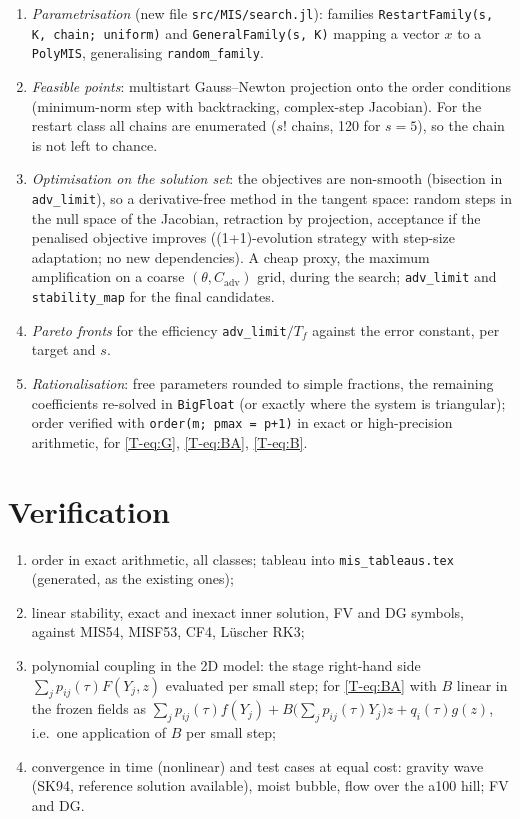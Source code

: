 \documentclass[11pt,a4paper]{article}
\begin{document}
\begin{enumerate}[label=S\arabic*]
\item \emph{Parametrisation} (new file \texttt{src/MIS/search.jl}): families \texttt{RestartFamily(s, K, chain; uniform)}
  and \texttt{GeneralFamily(s, K)} mapping a vector $x$ to a \texttt{PolyMIS}, generalising \texttt{random\_family}.
\item \emph{Feasible points}: multistart Gauss--Newton projection onto the order conditions (minimum-norm step with
  backtracking, complex-step Jacobian). For the restart class all chains are enumerated ($s!$ chains, 120 for $s=5$),
  so the chain is not left to chance.
\item \emph{Optimisation on the solution set}: the objectives are non-smooth (bisection in \texttt{adv\_limit}), so a
  derivative-free method in the tangent space: random steps in the null space of the Jacobian, retraction by
  projection, acceptance if the penalised objective improves ((1+1)-evolution strategy with step-size adaptation; no
  new dependencies). A cheap proxy, the maximum amplification on a coarse $(\theta,C_{\mathrm{adv}})$ grid, during
  the search; \texttt{adv\_limit} and \texttt{stability\_map} for the final candidates.
\item \emph{Pareto fronts} for the efficiency \texttt{adv\_limit}$/T_f$ against the error constant, per target and $s$.
\item \emph{Rationalisation}: free parameters rounded to simple fractions, the remaining coefficients re-solved in
  \texttt{BigFloat} (or exactly where the system is triangular); order verified with \texttt{order(m; pmax = p+1)} in
  exact or high-precision arithmetic, for \eqref{T-eq:G}, \eqref{T-eq:BA}, \eqref{T-eq:B}.
\end{enumerate}

\section{Verification}

\begin{enumerate}[label=V\arabic*]
\item order in exact arithmetic, all classes; tableau into \texttt{mis\_tableaus.tex} (generated, as the existing ones);
\item linear stability, exact and inexact inner solution, FV and DG symbols, against MIS54, MISF53, CF4, Lüscher RK3;
\item polynomial coupling in the 2D model: the stage right-hand side $\sum_jp_{ij}(\tau)F(Y_j,z)$ evaluated per small
  step; for \eqref{T-eq:BA} with $B$ linear in the frozen fields as $\sum_jp_{ij}(\tau)f(Y_j)+B\big(\sum_jp_{ij}(\tau)Y_j\big)z
  +q_i(\tau)g(z)$, i.e.\ one application of $B$ per small step;
\item convergence in time (nonlinear) and test cases at equal cost: gravity wave (SK94, reference solution available),
  moist bubble, flow over the a100 hill; FV and DG.
\end{enumerate}
\end{document}
